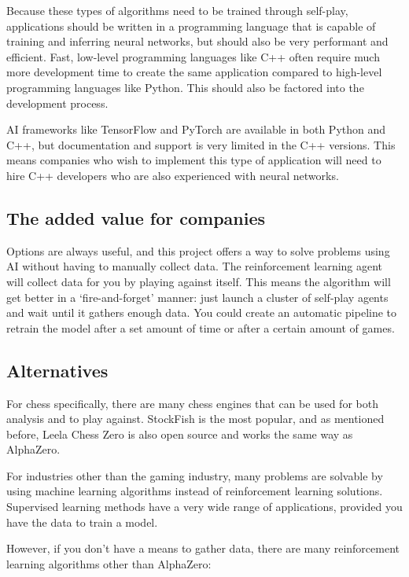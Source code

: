 \documentclass{article}
\begin{document}
Because these types of algorithms need to be trained through self-play, applications should be written
in a programming language that is capable of training and inferring neural networks, 
but should also be very performant and efficient. 
Fast, low-level programming languages like C++ often require much more development time
to create the same application compared to high-level programming languages like Python. 
This should also be factored into the development process.

AI frameworks like TensorFlow and PyTorch are available in both Python and C++, 
but documentation and support is very limited in the C++ versions. This means companies 
who wish to implement this type of application will need to hire C++ developers who
are also experienced with neural networks.

\subsection{The added value for companies}

Options are always useful, and this project offers a way to solve problems 
using AI without having to manually collect data. The reinforcement learning agent 
will collect data for you by playing against itself. This means the algorithm will
get better in a `fire-and-forget' manner: just launch a cluster of self-play agents
and wait until it gathers enough data. You could create an automatic pipeline to
retrain the model after a set amount of time or after a certain amount of games.

\subsection{Alternatives}

For chess specifically, there are many chess engines that can be used for both analysis
and to play against. StockFish is the most popular, and as mentioned before, 
Leela Chess Zero is also open source and works the same way as AlphaZero. 

For industries other than the gaming industry, many problems are solvable by using
machine learning algorithms instead of reinforcement learning solutions. 
Supervised learning methods have a very wide range of applications, provided 
you have the data to train a model.

However, if you don't have a means to gather data, there are many reinforcement
learning algorithms other than AlphaZero:
\end{document}
